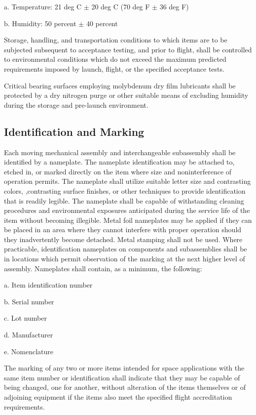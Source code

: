 \documentclass[12pt]{article}
\begin{document}
a. Temperature: 21 deg C $\pm$ 20 deg C (70 deg F $\pm$ 36 deg F)

b. Humidity: 50 percent $\pm$ 40 percent

Storage, handling, and transportation conditions to which items are to be subjected subsequent to acceptance testing, and prior to flight, shall be controlled to environmental conditions which do not exceed the maximum predicted requirements imposed by launch, flight, or the specified acceptance tests.

Critical bearing surfaces employing molybdenum dry film lubricants shall be protected by a dry nitrogen purge or other suitable means of excluding humidity during the storage and pre-launch environment.

\subsection{Identification and Marking} %
Each moving mechanical assembly and interchangeable subassembly shall be identified by a nameplate. 
The nameplate identification may be attached to, etched in, or marked directly on the item where size and noninterference of operation permits. 
The nameplate shall utilize suitable letter size and contrasting colors, ,contrasting surface finishes, or other techniques to provide identification that is readily legible. 
The nameplate shall be capable of withstanding cleaning procedures and environmental exposures anticipated during the service life of the item without becoming illegible.
Metal foil nameplates may be applied if they can be placed in an area where they cannot interfere with proper operation should they inadvertently become detached. 
Metal stamping shall not be used. 
Where practicable, identification nameplates on components and subassemblies shall be in locations which permit observation of the marking at the next higher level of assembly. 
Nameplates shall contain, as a minimum, the following:

a. Item identification number

b. Serial number

c. Lot number

d. Manufacturer

e. Nomenclature

The marking of any two or more items intended for space applications with the same item number or identification shall indicate that they may be capable of being changed, one for another, without alteration of the items themselves or of adjoining equipment if the items also meet the specified flight accreditation requirements.
\end{document}
